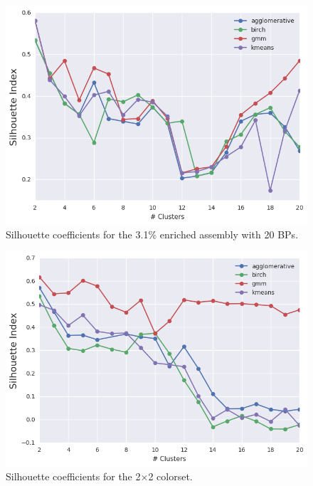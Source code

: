 \begin{figure}[h!]
\centering
\includegraphics[width=0.87\linewidth]{figures/results/model-select/assm-31-20BPs/silhouette-combined-U238-capture-1}
\vspace{2mm}
\caption[Silhouette coefficients for the 3.1\% enriched assembly with 20 BPs]{Silhouette coefficients for the 3.1\% enriched assembly with 20 \acp{BP}.}
\label{fig:chap11-assm-31-20BPs-silhouette-coeff}
\end{figure}

\clearpage

\begin{figure}[h!]
\centering
\includegraphics[width=0.87\linewidth]{figures/results/model-select/2x2/silhouette-combined-U238-capture-1}
\vspace{2mm}
\caption[Silhouette coefficients for the 2$\times$2 colorset]{Silhouette coefficients for the 2$\times$2 colorset.}
\label{fig:chap11-2x2-silhouette-coeff}
\end{figure}


